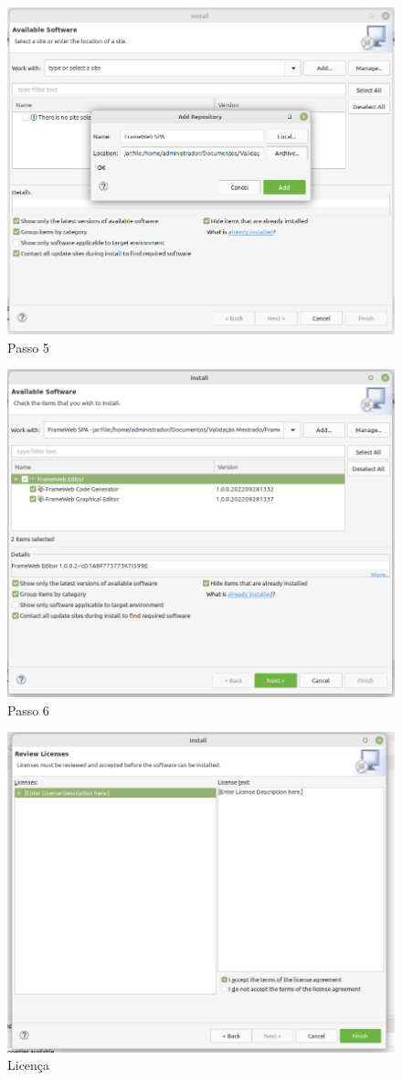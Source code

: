 \documentclass[
article,			%
11pt,				%
oneside,			%
a4paper,			%
english,			%
brazil,				%
sumario=tradicional
]{abntex2}
\begin{document}
\begin{figure}
	\centering
	\includegraphics[width=0.7\linewidth]{"figuras/Tutorial 2"}
	\caption{Passo 5}
	\label{fig:tutorial-2}
\end{figure}

\begin{figure}
	\centering
	\includegraphics[width=0.7\linewidth]{"figuras/Tutorial 3"}
	\caption{Passo 6}
	\label{fig:tutorial-3}
\end{figure}

\begin{figure}
	\centering
	\includegraphics[width=0.7\linewidth]{figuras/licenca}
	\caption{Licença}
	\label{fig:licenca}
\end{figure}
\end{document}
